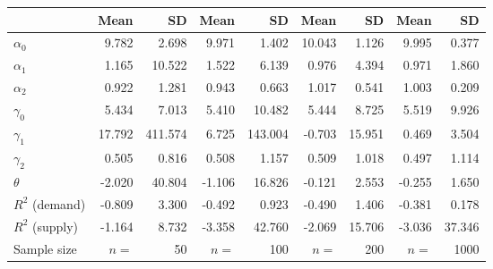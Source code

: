 
\begin{tabular}[t]{lrrrrrrrr}
\toprule
  & Mean & SD & Mean  & SD  & Mean   & SD   & Mean    & SD   \\
\midrule
$\alpha_{0}$ & 9.782 & 2.698 & 9.971 & 1.402 & 10.043 & 1.126 & 9.995 & 0.377\\
$\alpha_{1}$ & 1.165 & 10.522 & 1.522 & 6.139 & 0.976 & 4.394 & 0.971 & 1.860\\
$\alpha_{2}$ & 0.922 & 1.281 & 0.943 & 0.663 & 1.017 & 0.541 & 1.003 & 0.209\\
$\gamma_{0}$ & 5.434 & 7.013 & 5.410 & 10.482 & 5.444 & 8.725 & 5.519 & 9.926\\
$\gamma_{1}$ & 17.792 & 411.574 & 6.725 & 143.004 & -0.703 & 15.951 & 0.469 & 3.504\\
$\gamma_{2}$ & 0.505 & 0.816 & 0.508 & 1.157 & 0.509 & 1.018 & 0.497 & 1.114\\
$\theta$ & -2.020 & 40.804 & -1.106 & 16.826 & -0.121 & 2.553 & -0.255 & 1.650\\
$R^{2}$ (demand) & -0.809 & 3.300 & -0.492 & 0.923 & -0.490 & 1.406 & -0.381 & 0.178\\
$R^{2}$ (supply) & -1.164 & 8.732 & -3.358 & 42.760 & -2.069 & 15.706 & -3.036 & 37.346\\
Sample size & $n =$ & 50 & $n =$ & 100 & $n =$ & 200 & $n =$ & 1000\\
\bottomrule
\end{tabular}
